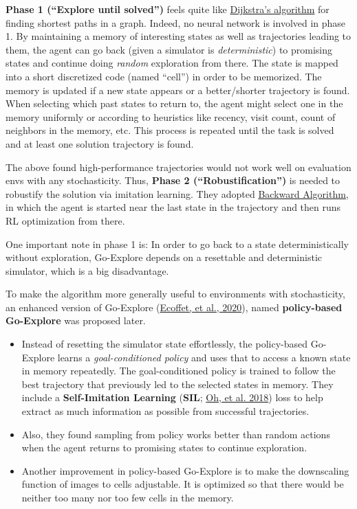 \textbf{Phase 1 (``Explore until solved'')} feels quite like \href{https://en.wikipedia.org/wiki/Dijkstra\%27s_algorithm}{Dijkstra's algorithm} for finding shortest paths in a graph. Indeed, no neural network is involved in phase 1. By maintaining a memory of interesting states as well as trajectories leading to them, the agent can go back (given a simulator is \emph{deterministic}) to promising states and continue doing \emph{random} exploration from there. The state is mapped into a short discretized code (named ``cell'') in order to be memorized. The memory is updated if a new state appears or a better/shorter trajectory is found. When selecting which past states to return to, the agent might select one in the memory uniformly or according to heuristics like recency, visit count, count of neighbors in the memory, etc. This process is repeated until the task is solved and at least one solution trajectory is found.

The above found high-performance trajectories would not work well on evaluation envs with any stochasticity. Thus, \textbf{Phase 2 (``Robustification'')} is needed to robustify the solution via imitation learning. They adopted \href{https://arxiv.org/abs/1812.03381}{Backward Algorithm}, in which the agent is started near the last state in the trajectory and then runs RL optimization from there.

One important note in phase 1 is: In order to go back to a state deterministically without exploration, Go-Explore depends on a resettable and deterministic simulator, which is a big disadvantage.

To make the algorithm more generally useful to environments with stochasticity, an enhanced version of Go-Explore (\href{https://arxiv.org/abs/2004.12919}{Ecoffet, et al., 2020}), named \textbf{policy-based Go-Explore} was proposed later.

\begin{itemize}
\tightlist
\item
  Instead of resetting the simulator state effortlessly, the policy-based Go-Explore learns a \emph{goal-conditioned policy} and uses that to access a known state in memory repeatedly. The goal-conditioned policy is trained to follow the best trajectory that previously led to the selected states in memory. They include a \textbf{Self-Imitation Learning} (\textbf{SIL}; \href{https://arxiv.org/abs/1806.05635}{Oh, et al. 2018}) loss to help extract as much information as possible from successful trajectories.
\item
  Also, they found sampling from policy works better than random actions when the agent returns to promising states to continue exploration.
\item
  Another improvement in policy-based Go-Explore is to make the downscaling function of images to cells adjustable. It is optimized so that there would be neither too many nor too few cells in the memory.
\end{itemize}

